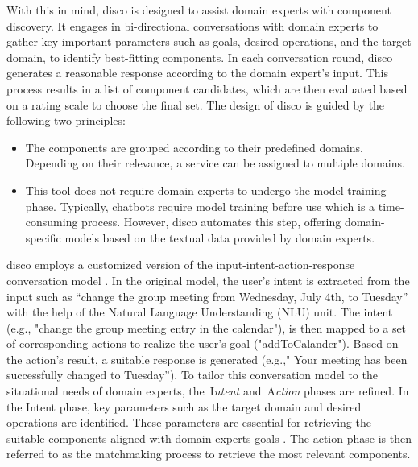With this in mind, \gls{disco} is designed to assist domain experts with
component discovery. It engages in bi-directional conversations with
domain experts to gather key important parameters such as goals, desired
operations, and the target domain, to identify best-fitting components.
In each conversation round, \gls{disco} generates a reasonable response
according to the domain expert's input. This process results in a list 
of component candidates, which are then evaluated based on a rating scale 
to choose the final set. The design of \gls{disco} is guided by the following two principles:
\begin{itemize}
  \item
  The components are grouped according to their predefined domains. Depending on their relevance, a service can be assigned to multiple domains.
  \item
  This tool does not require domain experts to undergo the model training phase. Typically, chatbots require model training before use which is a time-consuming process. However, \gls{disco} automates this step, offering domain-specific models based on the textual data provided by domain experts.
  \end{itemize}

\gls{disco} employs a customized version of the input-intent-action-response
conversation model \autocite{Baez2020}. In the original model,
the user's intent is extracted from the input such as ``change the group
meeting from Wednesday, July 4th, to Tuesday'' with the help of the
Natural Language Understanding (NLU) unit. The intent (e.g., "change
the group meeting entry in the calendar"), is then mapped to a set of
corresponding actions to realize the user's goal ("addToCalander").
Based on the action's result, a suitable response is generated (e.g.,"
Your meeting has been successfully changed to Tuesday''). To tailor this
conversation model to the situational needs of domain experts,
the~I\emph{ntent} and~A\emph{ction} phases are refined. In the Intent
phase, key parameters such as the target domain and desired operations
are identified. These parameters are essential for retrieving the
suitable components aligned with domain expert\textquotesingle s goals
\autocite{Zhang2020}. The action phase is then referred to as the
matchmaking process to retrieve the most relevant components.

